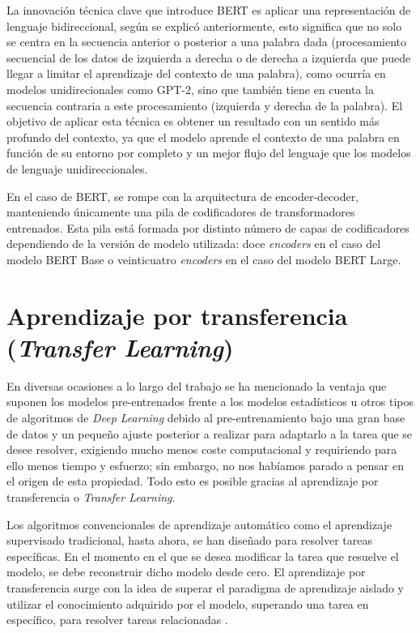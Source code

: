 La innovación técnica clave que introduce BERT es aplicar una representación de lenguaje bidireccional, según se explicó anteriormente, esto significa que no solo se centra en la secuencia anterior o posterior a una palabra dada (procesamiento secuencial de los datos de izquierda a derecha o de derecha a izquierda que puede llegar a limitar el aprendizaje del contexto de una palabra), como ocurría en modelos unidirecionales como GPT-2, sino que también tiene en cuenta la secuencia contraria a este procesamiento (izquierda y derecha de la palabra). El objetivo de aplicar esta técnica es obtener un resultado con un sentido más profundo del contexto, ya que el modelo aprende el contexto de una palabra en función de su entorno por completo y un mejor flujo del lenguaje que los modelos de lenguaje unidireccionales.

En el caso de BERT, se rompe con la arquitectura de encoder-decoder, manteniendo únicamente una pila de codificadores de transformadores entrenados. Esta pila está formada por distinto número de capas de codificadores dependiendo de la versión de modelo utilizada: doce \textit{encoders} en el caso del modelo BERT Base o veinticuatro \textit{encoders} en el caso del modelo BERT Large. 




\section{Aprendizaje por transferencia (\textit{Transfer Learning})}

En diversas ocasiones a lo largo del trabajo se ha mencionado la ventaja que suponen los modelos pre-entrenados frente a los modelos estadísticos u otros tipos de algoritmos de \textit{Deep Learning} debido al pre-entrenamiento bajo una gran base de datos y un pequeño ajuste posterior a realizar para adaptarlo a la tarea que se desee resolver, exigiendo mucho menos coste computacional y requiriendo para ello menos tiempo y esfuerzo; sin embargo, no nos habíamos parado a pensar en el origen de esta propiedad. Todo esto es posible gracias al aprendizaje por transferencia o \textit{Transfer Learning}.


Los algoritmos convencionales de aprendizaje automático como el aprendizaje supervisado tradicional, hasta ahora, se han diseñado para resolver tareas específicas. En el momento en el que se desea modificar la tarea que resuelve el modelo, se debe reconstruir dicho modelo desde cero. El aprendizaje por transferencia surge con la idea de superar el paradigma de aprendizaje aislado y utilizar el conocimiento adquirido por el modelo, superando una tarea en específico, para resolver tareas relacionadas \citep{pan2009survey}. 

